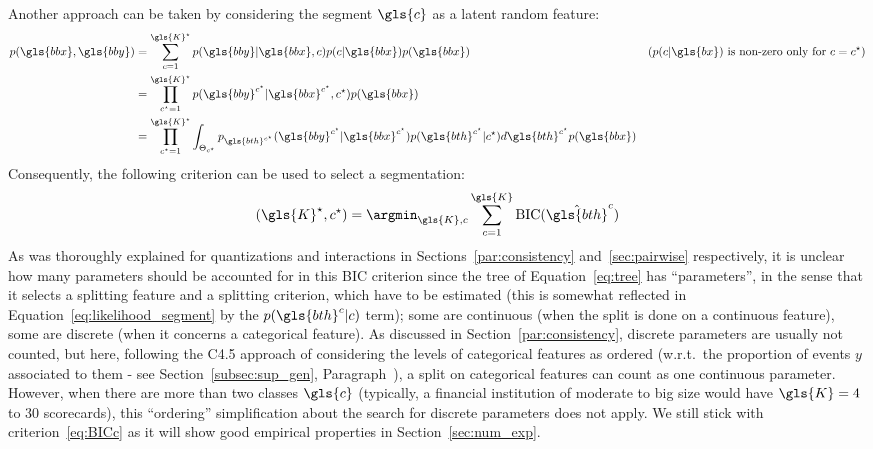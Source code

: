 Another approach can be taken by considering the segment $\gls{c}$ as a latent random feature:
\begin{align}
p(\gls{bbx},\gls{bby}) & =  \sum_{c=1}^{\gls{K}^\star} p(\gls{bby} | \gls{bbx}, c) p(c | \gls{bbx}) p(\gls{bbx}) & \text{($p(c | \gls{bx})$ is non-zero only for $c = c^\star$)} \nonumber \\
 & = \prod_{c^\star=1}^{\gls{K}^\star} p(\gls{bby}^{c^\star} | \gls{bbx}^{c^\star}, c^\star) p(\gls{bbx}) \nonumber \\
 & = \prod_{c^\star=1}^{\gls{K}^\star} \int_{\Theta_{c^\star}} p_{\gls{bth}^{c^\star}}(\gls{bby}^{c^\star} | \gls{bbx}^{c^\star}) p(\gls{bth}^{c^\star} | c^\star) d\gls{bth}^{c^\star} p(\gls{bbx}) \label{eq:likelihood_segment}
\end{align}
Consequently, the following criterion can be used to select a segmentation:
\begin{equation} \label{eq:BICc}
(\gls{K}^\star, c^\star) = \argmin_{\gls{K},c} \sum_{c=1}^{\gls{K}} \text{BIC}(\hat{\gls{bth}}^c)
\end{equation}
As was thoroughly explained for quantizations and interactions in Sections~\ref{par:consistency} and~\ref{sec:pairwise} respectively, it is unclear how many parameters should be accounted for in this BIC criterion since the tree of Equation~\eqref{eq:tree} has ``parameters'', in the sense that it selects a splitting feature and a splitting criterion, 
which have to be estimated (this is somewhat reflected in Equation~\eqref{eq:likelihood_segment} by the $p(\gls{bth}^c | c)$ term); some are continuous (when the split is done on a continuous feature), some are discrete (when it concerns a categorical feature). As discussed in Section~\ref{par:consistency}, discrete parameters are usually not counted, but here, following the C4.5 approach of considering the levels of categorical features as ordered (w.r.t.\ the proportion of events $y$ associated to them - see Section~\ref{subsec:sup_gen}, Paragraph~), a split on categorical features can count as one continuous parameter.
However, when there are more than two classes $\gls{c}$ (typically, a financial institution of moderate to big size would have $\gls{K} = 4$ to $30$ scorecards), this ``ordering'' simplification about the search for discrete parameters does not apply. We still stick with criterion~\eqref{eq:BICc} as it will show good empirical properties in Section~\ref{sec:num_exp}.



